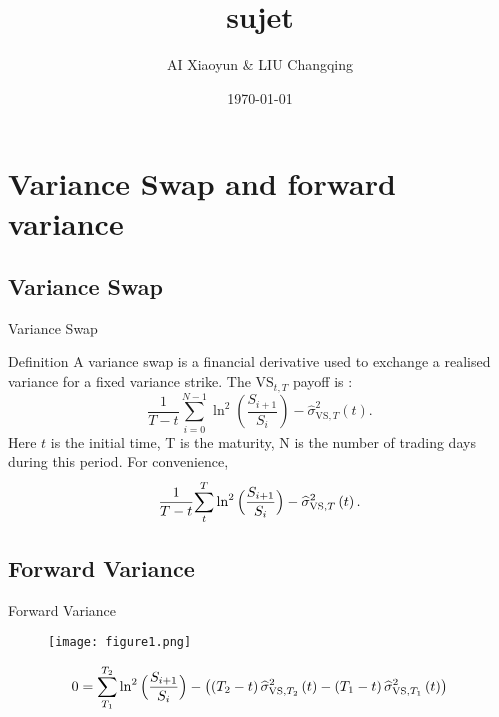 \documentclass{beamer}
\title[Cours name]{sujet}
\author{AI Xiaoyun \& LIU Changqing
}
\date{\today}
\begin{document}



\section{Variance Swap and forward variance}
    \subsection{Variance Swap}
        \begin{frame}{Variance Swap}
            \begin{block}{Definition}
            A variance swap is a financial derivative used to exchange a realised variance for a fixed variance strike. The $\text{VS}_{t,T}$ payoff is :
            \[\frac{1}{T-t}\sum_{i=0}^{N-1}\ln^{2}\left(\frac{S_{i+1}}{S_{i}}\right)- \widehat{\sigma}_{\text{VS},T}^{2}\left(t\right).\]
            Here $t$ is the initial time, T is the maturity, N is the number of trading days during this period.
            For convenience,
            \[\frac{1}{T-t}\underset{t}{\overset{T}{\sum}}\ln^{2}\Big{(}\frac{S_{i+1}}{S_{i}} \Big{)}-\widehat{\sigma}_{\text{VS},T}^{2}\left(t\right) .\]
            \end{block}
        \end{frame}
    \subsection{Forward Variance}
        \begin{frame}{Forward Variance}
            \begin{figure}
                \texttt{[image: figure1.png]}
                \label{fig:1}
            \end{figure}
        \[0 = \underset{T_{1}}{\overset{T_{2}}{\sum}}\ln^{2}\Big{(}\frac{S_{i+1}}{S_{i}} \Big{)}-\left(\left(T_{2}-t\right)\widehat{\sigma}_{\text{VS},T_{2}}^{2}\left( t\right)-\left(T_{1}-t\right)\widehat{\sigma}_{\text{VS},T_{1}}^{2}\left(t \right)\right)\]
        \end{frame}
\end{document}

